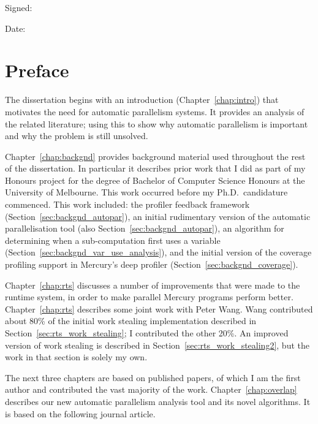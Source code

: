 \documentclass[a4paper,twoside,openright]{report}
\begin{document}
\vspace{1em}

\noindent Signed:

\vspace{1em}

\noindent Date:

\chapter*{Preface}

The dissertation begins with an introduction
(Chapter~\ref{chap:intro}) that
motivates the need for automatic parallelism systems.
It provides an analysis of the related literature;
using this to show why automatic parallelism is important
and why the problem is still unsolved.

Chapter~\ref{chap:backgnd} provides background material used throughout the
rest of the dissertation.
In particular it describes prior work 
that I did as part of my Honours project
for the degree of Bachelor of Computer Science Honours at the University of Melbourne.
This work occurred before my Ph.D.\ candidature commenced.
This work included:
the profiler feedback framework (Section~\ref{sec:backgnd_autopar}),
an initial rudimentary version of the automatic
parallelisation tool (also Section~\ref{sec:backgnd_autopar}),
an algorithm for determining when a sub-computation first uses
a variable (Section~\ref{sec:backgnd_var_use_analysis}),
and the initial version of the coverage profiling support in Mercury's deep
profiler (Section~\ref{sec:backgnd_coverage}).

Chapter~\ref{chap:rts} discusses a number of improvements that were made to
the runtime system, in order to make parallel Mercury programs perform
better.
Chapter~\ref{chap:rts} describes some joint work with Peter Wang.
Wang contributed about 80\% of the initial work stealing implementation 
described in Section~\ref{sec:rts_work_stealing};
I contributed the other 20\%.
An improved version of work stealing is described in
Section~\ref{sec:rts_work_stealing2},
but the work in that section is solely my own.

The next three chapters are based on published papers,
of which I am the first author and contributed the vast majority of the work.
Chapter~\ref{chap:overlap} describes our new automatic parallelism
analysis tool and its novel algorithms.
It is based on the following journal article.

\begin{quote}
\end{quote}
\end{document}
